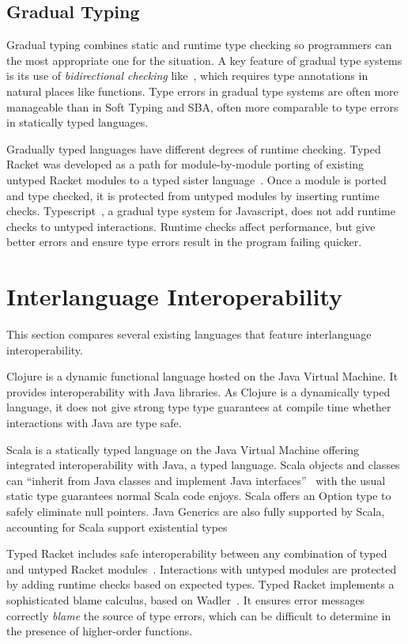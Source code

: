 \subsection{Gradual Typing}

Gradual typing combines static and runtime type checking so programmers
can the most appropriate one for the situation.
A key feature of gradual type systems is its use of \emph{bidirectional checking}
like~\cite{PT00}, which requires type annotations in natural places like functions.
Type errors in gradual type systems are often more manageable than in Soft Typing and SBA,
often more comparable to type errors in statically typed languages.

Gradually typed languages have different degrees of runtime checking.
Typed Racket was developed as a path for module-by-module
porting of existing untyped Racket modules to a typed sister language~\cite{Tob10}.
Once a module is ported and type checked, it is protected from untyped modules
by inserting runtime checks.
Typescript~\cite{TypeS2012}, a gradual type system for Javascript, 
does not add runtime checks to untyped interactions.
Runtime checks affect performance, but give better errors and ensure
type errors result in the program failing quicker.

\section{Interlanguage Interoperability}

This section compares several existing languages that feature interlanguage interoperability.

Clojure is a dynamic functional language hosted on the Java Virtual Machine. It provides 
interoperability with Java libraries. As Clojure is a dynamically typed language, it does
not give strong type type guarantees at compile time whether interactions with Java
are type safe.

Scala is a statically typed language on the Java Virtual Machine offering integrated interoperability with Java, a typed language.
Scala objects and classes can ``inherit from Java classes and implement Java interfaces''~\cite{OCD+}
with the usual static type guarantees normal Scala code enjoys.
Scala offers an Option type to safely eliminate null pointers.
Java Generics are also fully supported by Scala, accounting for Scala support existential types

Typed Racket includes safe interoperability between any combination of typed and untyped 
Racket modules~\cite{Tob10,TF08}. 
Interactions with untyped modules are protected by adding runtime checks based on expected types.
Typed Racket implements a sophisticated blame calculus, based on Wadler~\cite{WF09}. It ensures 
error messages correctly \emph{blame} the source of type errors,
which can be difficult to determine in the presence of higher-order functions. 

